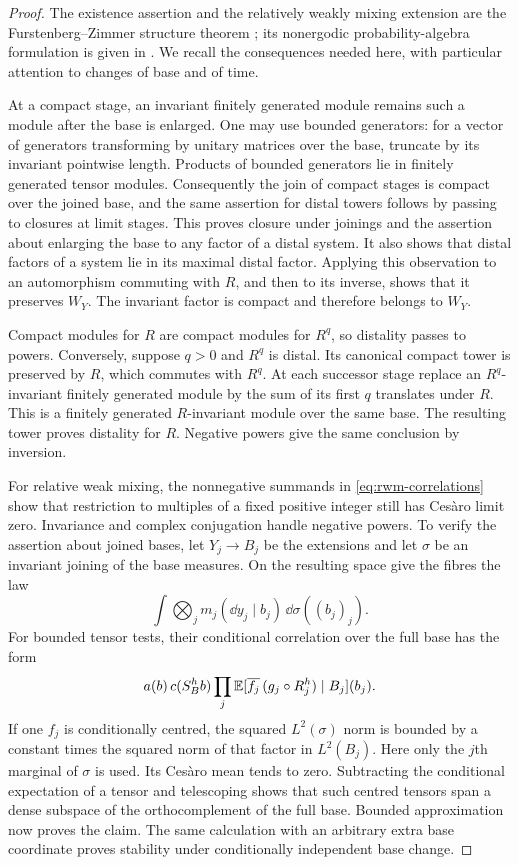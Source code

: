 \begin{proof}
The existence assertion and the relatively weakly mixing extension
are the Furstenberg--Zimmer structure theorem
\cite{Furstenberg,Zimmer}; its nonergodic probability-algebra formulation
is given in \cite[Theorems~1.1 and~1.2]{Jamneshan}.
We recall the consequences needed here, with particular attention to
changes of base and of time.

At a compact stage, an invariant finitely generated module remains such a
module after the base is enlarged.  One may use bounded generators:
for a vector of generators transforming by unitary matrices over the
base, truncate by its invariant pointwise length.  Products of bounded
generators lie in finitely generated tensor modules.  Consequently the join
of compact stages is compact over the joined base, and the same
assertion for distal towers follows by passing to closures at limit
stages.  This proves closure under joinings and the assertion about
enlarging the base to any factor of a distal system.  It also shows
that distal factors of a system lie in its maximal distal factor.
Applying this observation to an automorphism commuting with $R$, and
then to its inverse, shows that it preserves $W_Y$.  The invariant
factor is compact and therefore belongs to $W_Y$.

Compact modules for $R$ are compact modules for $R^q$, so distality
passes to powers.  Conversely, suppose $q>0$ and $R^q$ is distal.
Its canonical compact tower is preserved by $R$, which commutes with
$R^q$.  At each successor stage replace an $R^q$-invariant finitely
generated module by the sum of its first $q$ translates under $R$.
This is a finitely generated $R$-invariant module over the same base.
The resulting tower
proves distality for $R$.  Negative powers give the same conclusion
by inversion.

For relative weak mixing, the nonnegative summands in
\eqref{eq:rwm-correlations} show that restriction to multiples of a
fixed positive integer still has Ces\`aro limit zero.  Invariance and
complex conjugation handle negative powers.  To verify the assertion
about joined bases, let $Y_j\to B_j$ be the extensions and let $\sigma$
be an invariant joining of the base measures.  On the resulting space
give the fibres the law
\[
 \int\bigotimes_j m_j(\dd y_j\mid b_j)\,\dd\sigma((b_j)_j).
\]
For bounded tensor tests, their conditional correlation over the full
base has the form
\begin{equation}\label{eq:product-rwm-correlation}
 a(b)\,c(S_B^h b)
 \prod_j\mathbb E[\overline{f_j}\,(g_j\circ R_j^h)\mid B_j](b_j).
\end{equation}
If one $f_j$ is conditionally centred, the squared $L^2(\sigma)$ norm
is bounded by a constant times the squared norm of that factor in
$L^2(B_j)$.  Here only the $j$th marginal of $\sigma$ is used.
Its Ces\`aro mean tends to zero.  Subtracting the conditional
expectation of a tensor and telescoping shows that such centred
tensors span a dense subspace of the orthocomplement of the full
base.  Bounded approximation now proves the claim.  The same
calculation with an arbitrary extra base coordinate proves stability
under conditionally independent base change.


\end{proof}
